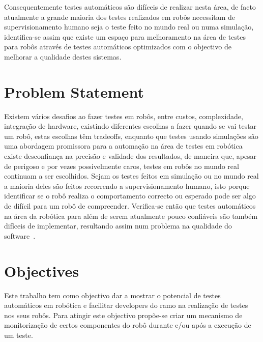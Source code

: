Consequentemente testes 
automáticos são difíceis de realizar nesta área, de facto atualmente a grande maioria dos testes 
realizados em robôs necessitam de supervisionamento humano seja o teste feito no mundo real ou numa 
simulação, identifica-se assim que existe um espaço para melhoramento na área de testes para robôs 
através de testes automáticos optimizados com o objectivo de melhorar a qualidade destes sistemas.

\section{Problem Statement}
\label{sec:problem}


Existem vários desafios ao fazer testes em robôs, entre custos, complexidade, integração de hardware, 
existindo diferentes escolhas a fazer quando se vai testar um robô, estas escolhas têm tradeoffs, 
enquanto que testes usando simulações são uma abordagem promissora para a automação na área de testes 
em robótica existe desconfiança na precisão e validade dos resultados, de maneira que, apesar de 
perigoso e por vezes possivelmente caros, testes em robôs no mundo real continuam a ser escolhidos. 
Sejam os testes feitos em simulação ou no mundo real a maioria deles são feitos recorrendo a 
supervisionamento humano, isto porque identificar se o robô realiza o comportamento correcto ou 
esperado pode ser algo de difícil para um robô de compreender. Verifica-se então que testes automáticos 
na área da robótica para além de serem atualmente pouco confiáveis são também difíceis de implementar, 
resultando assim num problema na qualidade do software~\cite{TestRob}.

\section{Objectives}
\label{sec:objectives}

Este trabalho tem como objectivo dar a mostrar o potencial de testes automáticos em robótica e facilitar 
developers do ramo na realização de testes nos seus robôs. Para atingir este objectivo propõe-se criar 
um mecanismo de monitorização de certos componentes do robô durante e/ou após a execução de um teste. 


